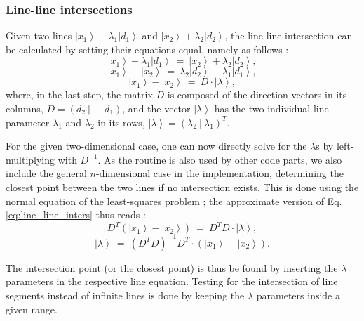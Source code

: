 \subsubsection*{Line-line intersections}
Given two lines $\left|x_1\right> + \lambda_1 \left|d_1\right>$ and $\left|x_2\right> + \lambda_2 \left|d_2\right>$, 
the line-line intersection can be calculated by setting their equations equal, namely as follows \cite{wiki_line_line_intersection}:
\begin{equation}
	\left|x_1\right> + \lambda_1 \left|d_1\right> \ =\ \left|x_2\right> + \lambda_2 \left|d_2\right>,
\end{equation}
\begin{equation}
	\left|x_1\right> - \left|x_2\right> \ =\  \lambda_2 \left|d_2\right> - \lambda_1 \left|d_1\right>,
\end{equation}
\begin{equation}
	\left|x_1\right> - \left|x_2\right> \ =\  D \cdot \left| \lambda \right>,
	\label{eq:line_line_inters}
\end{equation}
where, in the last step, the matrix $D$ is composed of the direction vectors in its columns, $D = \left( d_2 \ |\  -d_1 \right)$, 
and the vector $\left| \lambda \right>$ has the two individual line parameter $\lambda_1$ and $\lambda_2$ in its
rows, $\left| \lambda \right> = \left( \lambda_2 \ |\  \lambda_1 \right)^T$.

For the given two-dimensional case, one can now directly solve for the $\lambda$s by left-multiplying with $D^{-1}$.
As the routine is also used by other code parts, we also include the general $n$-dimensional case in the implementation, 
determining the closest point between the two lines if no intersection exists.
This is done using the normal equation of the least-squares problem \cite[p. 793]{Arens2015}; 
the approximate version of Eq. \ref{eq:line_line_inters} thus reads \cite{wiki_line_line_intersection}: 
\begin{equation}
	D^T \left(\left|x_1\right> - \left|x_2\right>\right) \ =\  D^T D \cdot \left| \lambda \right>,
\end{equation}
\begin{equation}
	\left| \lambda \right> \ =\  \left( D^T D \right)^{-1} D^T \cdot \left( \left|x_1\right> - \left|x_2\right> \right).
\end{equation}

The intersection point (or the closest point) is thus be found by inserting the $\lambda$ parameters in the respective line equation. 
Testing for the intersection of line segments instead of infinite lines is done by keeping the $\lambda$ parameters inside a given range.

